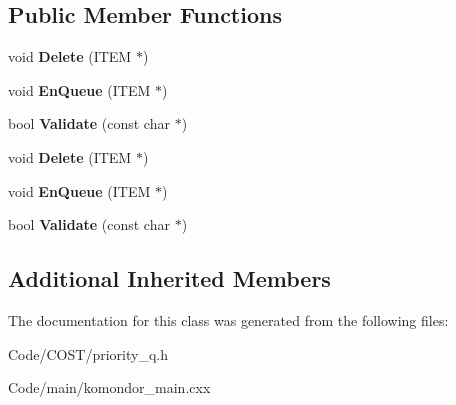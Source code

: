 \subsection*{Public Member Functions}
\begin{DoxyCompactItemize}
\item 
\mbox{\label{classGuardedQueue_a62c5b8e298aeb0903a03ff5bf008b5c6}} 
void {\bfseries Delete} (I\+T\+EM $\ast$)
\item 
\mbox{\label{classGuardedQueue_a71e254b8e68828c7b0af7dff1f4e8abc}} 
void {\bfseries En\+Queue} (I\+T\+EM $\ast$)
\item 
\mbox{\label{classGuardedQueue_abfa728e80e7dbdfb4225d79f020aa9ab}} 
bool {\bfseries Validate} (const char $\ast$)
\item 
\mbox{\label{classGuardedQueue_a62c5b8e298aeb0903a03ff5bf008b5c6}} 
void {\bfseries Delete} (I\+T\+EM $\ast$)
\item 
\mbox{\label{classGuardedQueue_a71e254b8e68828c7b0af7dff1f4e8abc}} 
void {\bfseries En\+Queue} (I\+T\+EM $\ast$)
\item 
\mbox{\label{classGuardedQueue_abfa728e80e7dbdfb4225d79f020aa9ab}} 
bool {\bfseries Validate} (const char $\ast$)
\end{DoxyCompactItemize}
\subsection*{Additional Inherited Members}


The documentation for this class was generated from the following files\+:\begin{DoxyCompactItemize}
\item 
Code/\+C\+O\+S\+T/priority\+\_\+q.\+h\item 
Code/main/komondor\+\_\+main.\+cxx\end{DoxyCompactItemize}
